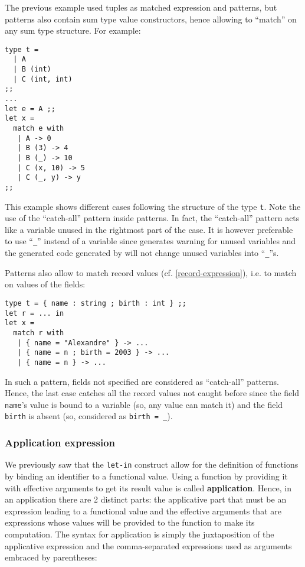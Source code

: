 The previous example used tuples as matched expression and patterns,
but patterns also contain sum type value constructors, hence allowing
to ``match'' on any sum type structure. For example:

{\scriptsize
\begin{lstlisting}
type t =
  | A
  | B (int)
  | C (int, int)
;;
...
let e = A ;;
let x =
  match e with
   | A -> 0
   | B (3) -> 4
   | B (_) -> 10
   | C (x, 10) -> 5
   | C (_, y) -> y
;;
\end{lstlisting}}

This example shows different cases following the structure of the type
{\tt t}. Note the use of the ``catch-all'' pattern
inside  patterns. In fact, the ``catch-all'' pattern acts like
a variable  unused in the rightmost part of the
case. It is however preferable to use ``{\tt \_}'' instead of a
variable since {\ocaml} generates warning for unused variables and the
generated {\ocaml} code generated by {\focal} will not change unused
variables into ``{\tt \_}''s.


\smallskip
Patterns also allow to match record values
(cf. \ref{record-expression}), i.e. to match on values of the fields:

{\scriptsize
\begin{lstlisting}
type t = { name : string ; birth : int } ;;
let r = ... in
let x =
  match r with
   | { name = "Alexandre" } -> ...
   | { name = n ; birth = 2003 } -> ...
   | { name = n } -> ...
\end{lstlisting}}

In such a pattern, fields not specified are considered as
``catch-all'' patterns. Hence, the last case catches all the record
values not caught before since the field {\tt name}'s value is bound
to a variable (so, any value can match it) and the field
{\tt birth} is absent (so, considered as {\tt birth = \_}).



\subsubsection{Application expression}
\label{function-application}
  We previously
saw that the {\tt let-in} construct allow for the definition of functions by
binding an identifier to a functional value. Using a function by
providing it with effective arguments to get its result value is
called {\bf application}. Hence, in an application there are 2
distinct parts: the applicative part that must be an expression
leading to a functional value and the effective arguments that are
expressions whose values will be provided to the function to make its
computation. The syntax for application is simply the juxtaposition of
the applicative expression and the comma-separated expressions used as
arguments embraced by parentheses:

